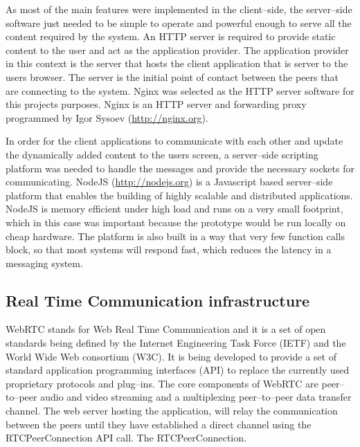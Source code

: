 \documentclass[english,12pt,a4paper,dvips]{article}
\begin{document}
As most of the main features were implemented in the client--side, the server--side software just needed to be simple to operate and powerful enough to serve all the content required by the system. An HTTP server is required to provide static content to the user and act as the application provider. The application provider in this context is the server that hosts the client application that is server to the users browser. The server is the initial point of contact between the peers that are connecting to the system. Nginx was selected as the HTTP server software for this projects purposes. Nginx is an HTTP server and forwarding proxy programmed by Igor Sysoev (\url{http://nginx.org}).

In order for the client applications to communicate with each other and update the dynamically added content to the users screen, a server--side scripting platform was needed to handle the messages and provide the necessary sockets for communicating. NodeJS (\url{http://nodejs.org}) is a Javascript based server--side platform that enables the building of highly scalable and distributed applications. NodeJS is memory efficient under high load and runs on a very small footprint, which in this case was important because the prototype would be run locally on cheap hardware. The platform is also built in a way that very few function calls block, so that most systems will respond fast, which reduces the latency in a messaging system.



\subsection{Real Time Communication infrastructure}

WebRTC stands for Web Real Time Communication and it is a set of open standards being defined by the Internet Engineering Task Force (IETF) and the World Wide Web consortium (W3C). It is being developed to provide a set of standard application programming interfaces (API) to replace the currently used proprietary protocols and plug--ins. The core components of WebRTC are peer--to--peer audio and video streaming and a multiplexing peer--to--peer data transfer channel. The web server hosting the application, will relay the communication between the peers until they have established a direct channel using the RTCPeerConnection API call. The RTCPeerConnection. \cite{Jennings}
\end{document}
